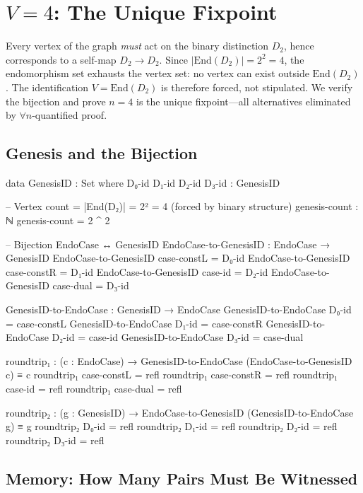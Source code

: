\documentclass[11pt,a4paper]{article}
\begin{document}
\section{$V = 4$: The Unique Fixpoint}
\label{sec:v4}

Every vertex of the graph \emph{must} act on the binary distinction $D_2$,
hence corresponds to a self-map $D_2 \to D_2$. Since
$|\mathrm{End}(D_2)| = 2^2 = 4$, the endomorphism set exhausts the vertex
set: no vertex can exist outside $\mathrm{End}(D_2)$. The identification
$V = \mathrm{End}(D_2)$ is therefore forced, not stipulated. We verify
the bijection and prove $n = 4$ is the unique fixpoint---all alternatives
eliminated by $\forall n$-quantified proof.

\subsection{Genesis and the Bijection}

\begin{code}
data GenesisID : Set where
  D₀-id D₁-id D₂-id D₃-id : GenesisID

-- Vertex count = |End(D₂)| = 2² = 4 (forced by binary structure)
genesis-count : ℕ
genesis-count = 2 ^ 2

-- Bijection EndoCase ↔ GenesisID
EndoCase-to-GenesisID : EndoCase → GenesisID
EndoCase-to-GenesisID case-constL = D₀-id
EndoCase-to-GenesisID case-constR = D₁-id
EndoCase-to-GenesisID case-id     = D₂-id
EndoCase-to-GenesisID case-dual   = D₃-id

GenesisID-to-EndoCase : GenesisID → EndoCase
GenesisID-to-EndoCase D₀-id = case-constL
GenesisID-to-EndoCase D₁-id = case-constR
GenesisID-to-EndoCase D₂-id = case-id
GenesisID-to-EndoCase D₃-id = case-dual

roundtrip₁ : (c : EndoCase) → GenesisID-to-EndoCase (EndoCase-to-GenesisID c) ≡ c
roundtrip₁ case-constL = refl
roundtrip₁ case-constR = refl
roundtrip₁ case-id     = refl
roundtrip₁ case-dual   = refl

roundtrip₂ : (g : GenesisID) → EndoCase-to-GenesisID (GenesisID-to-EndoCase g) ≡ g
roundtrip₂ D₀-id = refl
roundtrip₂ D₁-id = refl
roundtrip₂ D₂-id = refl
roundtrip₂ D₃-id = refl
\end{code}

\subsection{Memory: How Many Pairs Must Be Witnessed}
\end{document}
